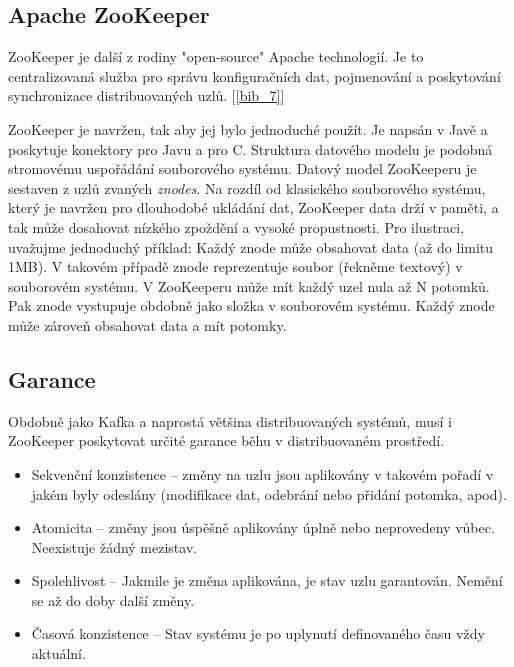 \documentclass[
  digital, %
  table,   %
  nolof,     %
  nolot,     %
  twoside, %
  nocover,
  monochrome,
  12pt
]{fithesis3}
\begin{document}
\newpage
\subsection{Apache ZooKeeper}
\label{sec:zookeeper}
ZooKeeper je další z rodiny "open-source" Apache technologií. Je to centralizovaná služba pro správu konfiguračních dat, pojmenování a poskytování synchronizace distribuovaných uzlů. [\ref{bib_7}]

ZooKeeper je navržen, tak aby jej bylo jednoduché použít. Je napsán v Javě a poskytuje konektory pro Javu a pro C. Struktura datového modelu je podobná stromovému uspořádání souborového systému. Datový model ZooKeeperu je sestaven z uzlů zvaných \textit{znodes}. Na rozdíl od klasického souborového systému, který je navržen pro dlouhodobé ukládání dat, ZooKeeper data drží v paměti, a tak může dosahovat nízkého zpoždění a vysoké propustnosti. Pro ilustraci, uvažujme jednoduchý příklad: Každý znode může obsahovat data (až do limitu 1MB). V takovém případě znode reprezentuje soubor (řekněme textový) v souborovém systému. V ZooKeeperu může mít každý uzel nula až N potomků. Pak znode vystupuje obdobně jako složka v souborovém systému. Každý znode může zároveň obsahovat data a mít potomky.

\subsection*{Garance}
Obdobně jako Kafka a naprostá většina distribuovaných systémů, musí i ZooKeeper poskytovat určité garance běhu v distribuovaném prostředí.

\begin{itemize}
  \item Sekvenční konzistence -- změny na uzlu jsou aplikovány v takovém pořadí v jakém byly odeslány (modifikace dat, odebrání nebo přidání potomka, apod).
  \item Atomicita -- změny jsou úspěšně aplikovány úplně nebo neprovedeny vůbec. Neexistuje žádný mezistav.
  \item Spolehlivost -- Jakmile je změna aplikována, je stav uzlu garantován. Nemění se až do doby další změny.
  \item Časová konzistence -- Stav systému je po uplynutí definovaného času vždy aktuální.
\end{itemize}
\end{document}
